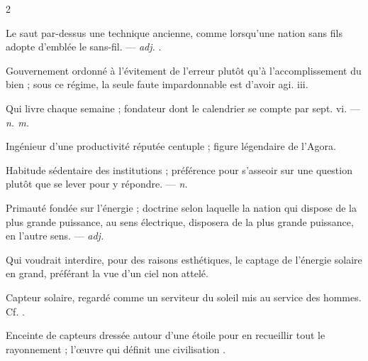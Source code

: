 \begin{multicols}{2}

 Le saut par-dessus une technique ancienne, comme lorsqu'une nation sans fils adopte d'emblée le sans-fil. —  \textit{adj.} .

 Gouvernement ordonné à l'évitement de l'erreur plutôt qu'à l'accomplissement du bien ; sous ce régime, la seule faute impardonnable est d'avoir agi.   iii.

 Qui livre chaque semaine ; fondateur dont le calendrier se compte par sept.   vi. —  \textit{n. m.}

 Ingénieur d'une productivité réputée centuple ; figure légendaire de l'Agora.  

 Habitude sédentaire des institutions ; préférence pour s'asseoir sur une question plutôt que se lever pour y répondre. —  \textit{n.}

 Primauté fondée sur l'énergie ; doctrine selon laquelle la nation qui dispose de la plus grande puissance, au sens électrique, disposera de la plus grande puissance, en l'autre sens. —  \textit{adj.}

  Qui voudrait interdire, pour des raisons esthétiques, le captage de l'énergie solaire en grand, préférant la vue d'un ciel non attelé.

 Capteur solaire, regardé comme un serviteur du soleil mis au service des hommes.  Cf. .

 Enceinte de capteurs dressée autour d'une étoile pour en recueillir tout le rayonnement ; l'œuvre qui définit une civilisation .


\end{multicols}
